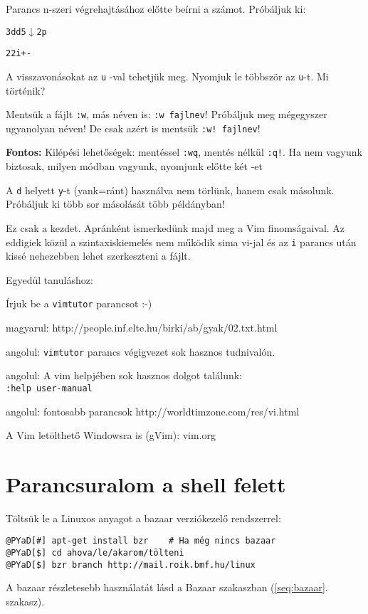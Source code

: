 \documentclass[a4paper]{article}
\newcommand{\code}{\texttt}
\newcommand{\Esc}{\framebox{\texttt{Esc}}}
\begin{document}
Parancs n-szeri végrehajtásához előtte beírni a számot. Próbáljuk ki:

\code{3dd5$\downarrow$2p}

\code{22i+-} \Esc

A visszavonásokat az \code{u} -val tehetjük meg. Nyomjuk le többször az
\code{u}-t. Mi történik?

Mentsük a fájlt \code{:w}, más néven is: \code{:w fajlnev}! Próbáljuk
meg mégegyszer ugyanolyan néven! De csak azért is mentsük \code{:w! fajlnev}!

\textbf{Fontos:} Kilépési lehetőségek: mentéssel \code{:wq}, mentés nélkül
\code{:q!}. Ha nem vagyunk biztosak, milyen módban vagyunk, nyomjunk
előtte két \Esc-et

A \code{d} helyett \code{y}-t (yank=ránt) használva nem törlünk, hanem csak
másolunk. Próbáljuk ki több sor másolását több példányban!

Ez csak a kezdet. Apránként ismerkedünk majd meg a Vim finomságaival.
Az eddigiek közül a szintaxiskiemelés nem működik sima vi-jal és az
\code{i} parancs után kissé nehezebben lehet szerkeszteni a fájlt.

Egyedül tanuláshoz:

Írjuk be a \code{vimtutor} parancsot :-)

magyarul: http://people.inf.elte.hu/birki/ab/gyak/02.txt.html

angolul: \code{vimtutor} parancs végigvezet sok hasznos tudnivalón.

angolul: A vim helpjében sok hasznos dolgot találunk:\\ \verb!:help user-manual!

angolul: fontosabb parancsok http://worldtimzone.com/res/vi.html

A Vim letölthető Windowsra is (gVim): vim.org

\newpage
\section{Parancsuralom a shell felett}

Töltsük le a Linuxos anyagot a bazaar verziókezelő rendszerrel:
\begin{Verbatim}[commandchars=@\[\]]
@PYaD[#] apt-get install bzr    # Ha még nincs bazaar
@PYaD[$] cd ahova/le/akarom/tölteni
@PYaD[$] bzr branch http://mail.roik.bmf.hu/linux
\end{Verbatim}

A bazaar részletesebb használatát lásd a Bazaar szakaszban
(\ref{seq:bazaar}. szakasz).
\end{document}
